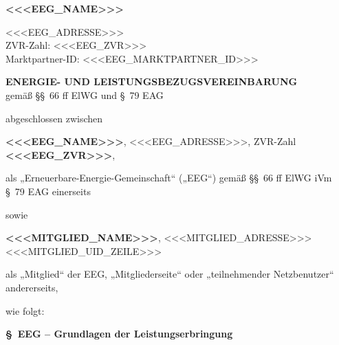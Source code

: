 \documentclass[a4paper,11pt]{article}
\newcounter{parasec}
\newcommand{\parasec}[1]{%
  \stepcounter{parasec}%
  \par\Needspace*{5\baselineskip}%
  \bigskip
  {\large\bfseries\color{tuerkis}\S\ \theparasec\quad #1}\par\nopagebreak
  \smallskip\nopagebreak
}
\begin{document}
\noindent
\begin{minipage}[t]{0.55\textwidth}
  \raggedright{}
  {\LARGE\bfseries\color{tuerkis}<<<EEG_NAME>>>\par}
\end{minipage}%
\begin{minipage}[t]{0.45\textwidth}
  \raggedleft
  \small
  <<<EEG_ADRESSE>>>\\
  ZVR-Zahl: <<<EEG_ZVR>>>\\
  Marktpartner-ID: <<<EEG_MARKTPARTNER_ID>>>
\end{minipage}

\bigskip
{}

\bigskip

\begin{center}
  {\LARGE\bfseries ENERGIE- UND LEISTUNGSBEZUGSVEREINBARUNG}\\[0.5em]
  {\small gemäß \S\S\ 66 ff ElWG und \S\ 79 EAG}
\end{center}

\bigskip

\noindent abgeschlossen zwischen

\bigskip

\noindent \textbf{<<<EEG_NAME>>>}, <<<EEG_ADRESSE>>>, ZVR-Zahl \textbf{<<<EEG_ZVR>>>},

\smallskip
\noindent als „Erneuerbare-Energie-Gemeinschaft“ („EEG“) gemäß \S\S\ 66 ff ElWG iVm \S\ 79 EAG einerseits

\bigskip
\noindent sowie

\bigskip
\noindent \textbf{<<<MITGLIED_NAME>>>}, <<<MITGLIED_ADRESSE>>>\\
<<<MITGLIED_UID_ZEILE>>>

\smallskip
\noindent als „Mitglied“ der EEG, „Mitgliederseite“ oder „teilnehmender Netzbenutzer“ andererseits,

\bigskip
\noindent wie folgt:

\parasec{EEG – Grundlagen der Leistungserbringung}
\end{document}
